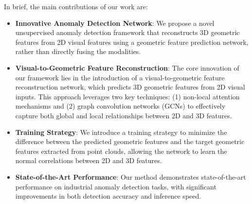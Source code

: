 In brief, the main contributions of our work are:

\begin{itemize}
    \item \textbf{Innovative Anomaly Detection Network}: We propose a novel unsupervised anomaly detection framework that reconstructs 3D geometric features from 2D visual features using a geometric feature prediction network, rather than directly fusing the modalities.
     
    \item \textbf{Visual-to-Geometric Feature Reconstruction}: The core innovation of our framework lies in the introduction of a visual-to-geometric feature reconstruction network, which predicts 3D geometric features from 2D visual inputs. This approach leverages two key techniques: (1) non-local attention mechanisms and (2) graph convolution networks (GCNs) to effectively capture both global and local relationships between 2D and 3D features.
     
    \item \textbf{Training Strategy}: We introduce a training strategy to minimize the difference between the predicted geometric features and the target geometric features extracted from point clouds, allowing the network to learn the normal correlations between 2D and 3D features.
    
    \item \textbf{State-of-the-Art Performance}: Our method demonstrates state-of-the-art performance on industrial anomaly detection tasks, with significant improvements in both detection accuracy and inference speed.
\end{itemize}
